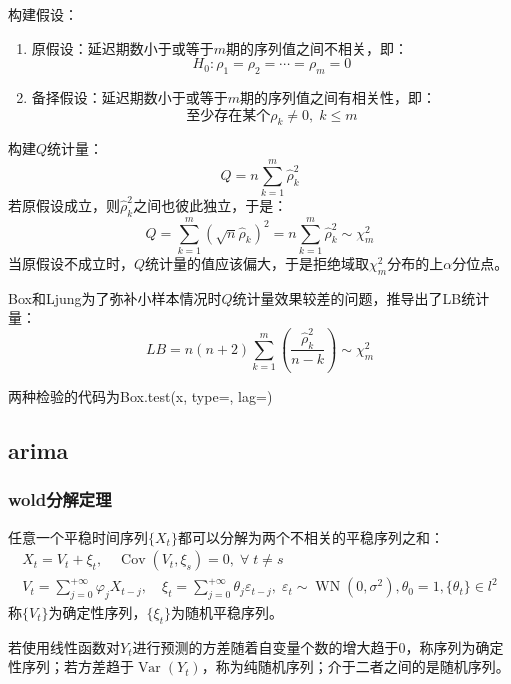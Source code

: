 \begin{derivation}
	构建假设：
	\begin{enumerate}
		\item 原假设：延迟期数小于或等于$m$期的序列值之间不相关，即：
		\begin{equation*}
			H_0:\rho_1=\rho_2=\cdots=\rho_m=0
		\end{equation*}
		\item 备择假设：延迟期数小于或等于$m$期的序列值之间有相关性，即：
		\begin{equation*}
			\text{至少存在某个}\rho_k\ne0,\;k\leqslant m
		\end{equation*}
	\end{enumerate}
	构建$Q$统计量：
	\begin{equation*}
		Q=n\sum_{k=1}^{m}\hat{\rho}_k^2
	\end{equation*}
	若原假设成立，则$\hat{\rho}_k^2$之间也彼此独立，于是：
	\begin{equation*}
		Q=\sum_{k=1}^{m}(\sqrt{n}\hat{\rho}_k)^2=n\sum_{k=1}^{m}\hat{\rho}_k^2\sim\chi^2_m
	\end{equation*}
	当原假设不成立时，$Q$统计量的值应该偏大，于是拒绝域取$\chi^2_m$分布的上$\alpha$分位点。\par
	Box和Ljung为了弥补小样本情况时$Q$统计量效果较差的问题，推导出了LB统计量：
	\begin{equation*}
		LB=n(n+2)\sum_{k=1}^{m}\left(\frac{\hat{\rho}_k^2}{n-k}\right)\sim\chi^2_m
	\end{equation*}\par
	两种检验的代码为Box.test(x, type=, lag=)
\end{derivation}

\subsection{arima}
\subsubsection{wold分解定理}
任意一个平稳时间序列$\{X_t\}$都可以分解为两个不相关的平稳序列之和：
\begin{gather*}
	X_t=V_t+\xi_t,\quad\operatorname{Cov}(V_t,\xi_s)=0,\;\forall\;t\ne s \\ V_t=\sum_{j=0}^{+\infty}\varphi_jX_{t-j},\quad\xi_t=\sum_{j=0}^{+\infty}\theta_j\varepsilon_{t-j},\;\varepsilon_t\sim\operatorname{WN}(0,\sigma^2),\theta_0=1,\{\theta_t\}\in l^2
\end{gather*}
称$\{V_t\}$为确定性序列，$\{\xi_t\}$为随机平稳序列。\par
若使用线性函数对$Y_t$进行预测的方差随着自变量个数的增大趋于$0$，称序列为确定性序列；若方差趋于$\operatorname{Var}(Y_t)$，称为纯随机序列；介于二者之间的是随机序列。

